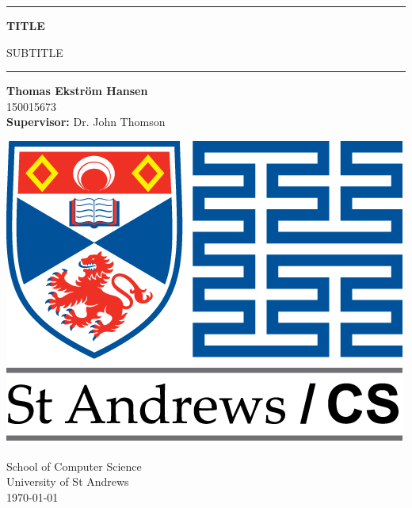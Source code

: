 \begin{titlepage}
    \begin{center}
        \vspace*{1cm}
        
        {\rule{0.9\textwidth}{0.5mm}}
        
        \Huge
        \textbf{TITLE}
        
        \LARGE
        SUBTITLE
        
        {\noindent \hspace*{-0.65cm} \rule[0.3cm]{1.08\textwidth}{0.5mm}}
        
        \vspace{1.5cm}
        
        \sffamily
        \Large
        \textbf{Thomas Ekstr{\" o}m Hansen}\\150015673
        \\
        \large
        \textbf{Supervisor:} Dr. John Thomson
        \Large
        \rmfamily
        
        \vfill
        
        \includegraphics[width=0.4\linewidth]{logo-uni-cs-mintext-long.png}
        
        \vspace{1.5cm}
        
        School of Computer Science
        \\
        University of St Andrews
        \\
        \vspace{1.5mm}
        \today
    \end{center}
\end{titlepage}